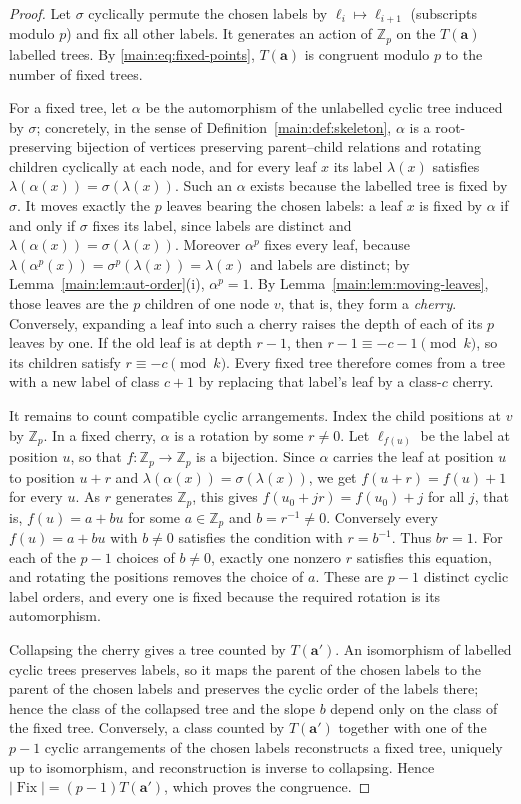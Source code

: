 \documentclass[11pt]{article}
\theoremstyle{definition}
\theoremstyle{remark}
\numberwithin{equation}{section}
\numberwithin{figure}{section}
\newcommand{\Z}{\mathbb Z}
\DeclareMathOperator{\Fix}{Fix}
\begin{document}
\begin{proof}
Let $\sigma$ cyclically permute the chosen labels by $\ell_i\mapsto\ell_{i+1}$ (subscripts modulo $p$) and fix all other labels.  It generates an action of $\Z_p$ on the $T(\mathbf a)$ labelled trees.  By \eqref{main:eq:fixed-points}, $T(\mathbf a)$ is congruent modulo $p$ to the number of fixed trees.

For a fixed tree, let $\alpha$ be the automorphism of the unlabelled cyclic tree induced by $\sigma$; concretely, in the sense of Definition~\ref{main:def:skeleton}, $\alpha$ is a root-preserving bijection of vertices preserving parent--child relations and rotating children cyclically at each node, and for every leaf $x$ its label $\lambda(x)$ satisfies $\lambda(\alpha(x))=\sigma(\lambda(x))$.  Such an $\alpha$ exists because the labelled tree is fixed by $\sigma$.  It moves exactly the $p$ leaves bearing the chosen labels: a leaf $x$ is fixed by $\alpha$ if and only if $\sigma$ fixes its label, since labels are distinct and $\lambda(\alpha(x))=\sigma(\lambda(x))$.  Moreover $\alpha^p$ fixes every leaf, because $\lambda(\alpha^p(x))=\sigma^p(\lambda(x))=\lambda(x)$ and labels are distinct; by Lemma~\ref{main:lem:aut-order}(i), $\alpha^p=1$.  By Lemma~\ref{main:lem:moving-leaves}, those leaves are the $p$ children of one node $v$, that is, they form a \emph{cherry}.  Conversely, expanding a leaf into such a cherry raises the depth of each of its $p$ leaves by one.  If the old leaf is at depth $r-1$, then $r-1\equiv-c-1\pmod k$, so its children satisfy $r\equiv-c\pmod k$.  Every fixed tree therefore comes from a tree with a new label of class $c+1$ by replacing that label's leaf by a class-$c$ cherry.

It remains to count compatible cyclic arrangements.  Index the child positions at $v$ by $\Z_p$.  In a fixed cherry, $\alpha$ is a rotation by some $r\ne0$.  Let $\ell_{f(u)}$ be the label at position $u$, so that $f:\Z_p\to\Z_p$ is a bijection.  Since $\alpha$ carries the leaf at position $u$ to position $u+r$ and $\lambda(\alpha(x))=\sigma(\lambda(x))$, we get $f(u+r)=f(u)+1$ for every $u$.  As $r$ generates $\Z_p$, this gives $f(u_0+jr)=f(u_0)+j$ for all $j$, that is, $f(u)=a+bu$ for some $a\in\Z_p$ and $b=r^{-1}\ne0$.  Conversely every $f(u)=a+bu$ with $b\ne0$ satisfies the condition with $r=b^{-1}$.  Thus $br=1$.  For each of the $p-1$ choices of $b\ne0$, exactly one nonzero $r$ satisfies this equation, and rotating the positions removes the choice of $a$.  These are $p-1$ distinct cyclic label orders, and every one is fixed because the required rotation is its automorphism.

Collapsing the cherry gives a tree counted by $T(\mathbf a')$.  An isomorphism of labelled cyclic trees preserves labels, so it maps the parent of the chosen labels to the parent of the chosen labels and preserves the cyclic order of the labels there; hence the class of the collapsed tree and the slope $b$ depend only on the class of the fixed tree.  Conversely, a class counted by $T(\mathbf a')$ together with one of the $p-1$ cyclic arrangements of the chosen labels reconstructs a fixed tree, uniquely up to isomorphism, and reconstruction is inverse to collapsing.  Hence $|\Fix|=(p-1)T(\mathbf a')$, which proves the congruence.
\end{proof}
\end{document}
